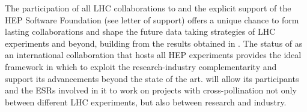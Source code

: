 The participation of all LHC collaborations to \acronym and the explicit support of the HEP Software Foundation (see letter of support) offers a unique chance to form lasting collaborations and shape the future data taking strategies of LHC experiments and beyond, building from the results obtained in \acronym. 
The status of \cernentity as an international collaboration that hosts all HEP experiments provides the ideal framework in which to exploit the research-industry complementarity and support its advancements beyond the state of the art.
\acronym will allow its participants and the ESRs involved in it to work on projects with cross-pollination not only between different LHC experiments, but also between research and industry. 







%
%
%
%
%
%

